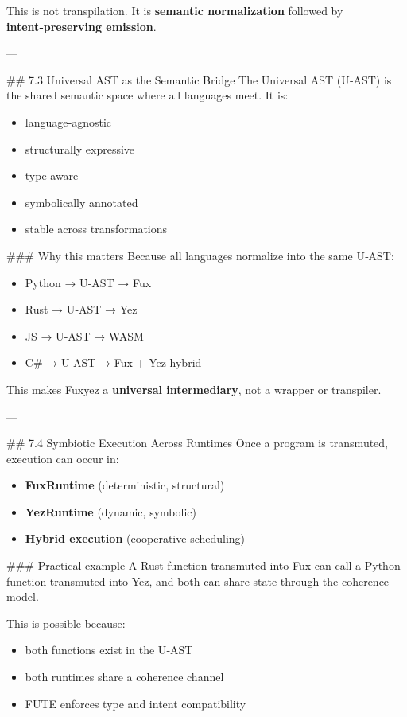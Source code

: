 \documentclass[12pt, a4paper]{book}
\begin{document}
This is not transpilation.  
It is \textbf{semantic normalization} followed by \textbf{intent‑preserving emission}.

---

\#\# 7.3 Universal AST as the Semantic Bridge  
The Universal AST (U‑AST) is the shared semantic space where all languages meet. It is:

\begin{itemize}
  \item language‑agnostic  
  \item structurally expressive  
  \item type‑aware  
  \item symbolically annotated  
  \item stable across transformations  
\end{itemize}

\#\#\# Why this matters  
Because all languages normalize into the same U‑AST:

\begin{itemize}
  \item Python → U‑AST → Fux  
  \item Rust → U‑AST → Yez  
  \item JS → U‑AST → WASM  
  \item C\# → U‑AST → Fux + Yez hybrid  
\end{itemize}

This makes Fuxyez a \textbf{universal intermediary}, not a wrapper or transpiler.

---

\#\# 7.4 Symbiotic Execution Across Runtimes  
Once a program is transmuted, execution can occur in:

\begin{itemize}
  \item \textbf{FuxRuntime} (deterministic, structural)  
  \item \textbf{YezRuntime} (dynamic, symbolic)  
  \item \textbf{Hybrid execution} (cooperative scheduling)  
\end{itemize}

\#\#\# Practical example  
A Rust function transmuted into Fux can call a Python function transmuted into Yez, and both can share state through the coherence model.

This is possible because:

\begin{itemize}
  \item both functions exist in the U‑AST  
  \item both runtimes share a coherence channel  
  \item FUTE enforces type and intent compatibility  
\end{itemize}
\end{document}
